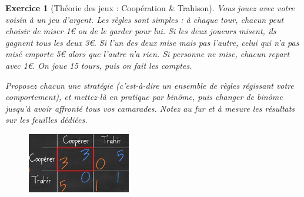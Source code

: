 \documentclass[12pt]{article}
\theoremstyle{break}
\newtheorem{exo}{Exercice}
\begin{document}
\begin{exo}[Théorie des jeux : Coopération \& Trahison]
Vous jouez avec votre voisin à un jeu d'argent. Les règles sont simples : à chaque tour, chacun peut choisir de miser 1€ ou de le garder pour lui. Si les deux joueurs misent, ils gagnent tous les deux 3€. Si l'un des deux mise mais pas l'autre, celui qui n'a pas misé emporte 5€ alors que l'autre n'a rien. Si personne ne mise, chacun repart avec 1€. On joue 15 tours, puis on fait les comptes.

Proposez chacun une stratégie (c'est-à-dire un ensemble de règles régissant votre comportement), et mettez-là en pratique par binôme, puis changer de binôme jusqu'à avoir affronté tous vos camarades. Notez au fur et à mesure les résultats sur les feuilles dédiées.

\begin{figure}[h!]
	\centering
    \includegraphics[width=0.4\textwidth]{images/CooperationTrahison.jpg}
\end{figure}
\end{exo}
\end{document}

